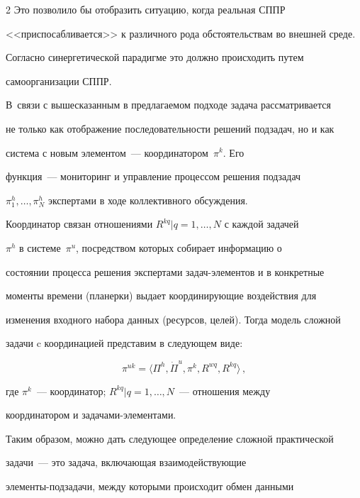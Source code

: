 \begin{multicols}{2}
Это позволило бы отобразить ситуацию, когда реальная СППР 


<<приспосабливается>> к различного рода обстоятельствам во внешней среде. 


Согласно синергетической парадигме это должно  происходить путем 


самоорганизации СППР.


  


  В~связи с вышесказанным в предлагаемом подходе задача рассматривается 


не только как отображение последовательности решений подзадач, но и как 


система с новым элементом~--- координатором~$\pi^k$. Его 


функция~--- мониторинг и управление процессом решения подзадач 


$\pi_1^h,\ldots , \pi_N^h$ экспертами в ходе коллективного обсуждения. 


Координатор связан отношениями $R^{kq}\vert q=1,\ldots ,N$ с каж\-дой задачей 


$\pi^h$ в системе~$\pi^u$, посредством которых собирает информацию о 


состоянии процесса решения экспертами за\-дач-эле\-мен\-тов и в конкретные 


моменты времени (планерки) выдает координирующие воздействия для 


изменения входного набора данных (ресурсов, целей). Тогда модель сложной 


задачи c координацией представим в следующем виде:


  \begin{equation}


  \pi^{uk} =\langle \Pi^h, \dot{\Pi}^u, \pi^k, R^{wq}, R^{kq}\rangle\,,


  \label{e2kol}


  \end{equation}


где $\pi^k$~--- координатор; $R^{kq}\vert q=1, \ldots , N$~--- отношения между 


координатором и за\-да\-ча\-ми-эле\-мен\-тами.


  


  Таким образом, можно дать следующее определение сложной практической 


задачи~--- это задача, включающая взаимодействующие 


  эле\-мен\-ты-под\-за\-да\-чи, между которыми происходит обмен данными 



\end{multicols}
